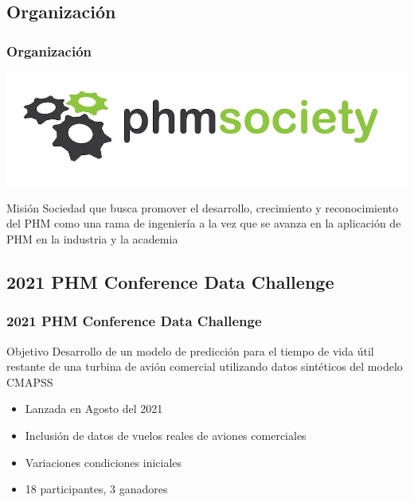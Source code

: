 \documentclass{beamer}
\begin{document}
        \subsection{Organización}
            \begin{frame}
                \frametitle{Organización}
                \centering
                \includegraphics[scale=0.3]{phm_logo.jpg}
                \begin{block}{Misión}
                    Sociedad que busca promover el desarrollo, crecimiento y reconocimiento del PHM como una rama de ingeniería a la vez que se avanza en la aplicación de PHM en la industria y la academia \cite{phm-mission}
                \end{block}
            \end{frame}

        \subsection{2021 PHM Conference Data Challenge}
            \begin{frame}
                \frametitle{2021 PHM Conference Data Challenge}
                \begin{block}{Objetivo}
                    Desarrollo de un modelo de predicción para el tiempo de vida útil restante de una turbina de avión comercial utilizando datos sintéticos del modelo CMAPSS \cite{arias2021aircraft}
                \end{block}

                \begin{itemize}
                    \item Lanzada en Agosto del 2021
                    \item Inclusión de datos de vuelos reales de aviones comerciales
                    \item Variaciones condiciones iniciales
                    \item 18 participantes, 3 ganadores
                \end{itemize}
            \end{frame}
\end{document}
